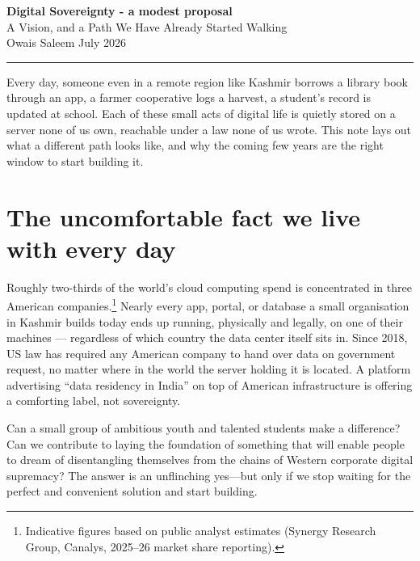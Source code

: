 \documentclass[12pt]{article}
\begin{document}
\begin{center}
  {\LARGE\bfseries\color{sovDark} Digital Sovereignty - a modest proposal}\\[6pt]
  {\Large\color{sovGrey} A Vision, and a Path We Have Already Started Walking}\\[10pt]
  {\normalsize Owais Saleem \hspace{4pt}\textbar\hspace{4pt} July 2026}
\end{center}

\vspace{6pt}
{\color{sovGold}\rule{\linewidth}{1pt}}
\vspace{6pt}

Every day, someone even in a remote region like Kashmir borrows a library book through an app, a farmer
cooperative logs a harvest, a student's record is updated at school. Each of these
small acts of digital life is quietly stored on a server none of us own, reachable
under a law none of us wrote. This note lays out what a different path
looks like, and why the coming few years are the right window to start building it.

\section{The uncomfortable fact we live with every day}

Roughly two-thirds of the world's cloud computing spend is concentrated in three
American companies.\footnote{Indicative figures based on public analyst estimates
(Synergy Research Group, Canalys, 2025--26 market share reporting).} Nearly every
app, portal, or database a small organisation in Kashmir builds today ends up
running, physically and legally, on one of their machines --- regardless of which
country the data center itself sits in. Since 2018, US law has required any
American company to hand over data on government request, no matter where in the
world the server holding it is located. A platform advertising ``data residency in
India'' on top of American infrastructure is offering a comforting label, not
sovereignty.

Can a small group of ambitious youth and talented students make a difference? Can we contribute to laying the foundation of something that will enable people to dream of disentangling themselves from the chains of Western corporate digital supremacy? The answer is an unflinching yes—but only if we stop waiting for the perfect and convenient solution and start building.
\end{document}
